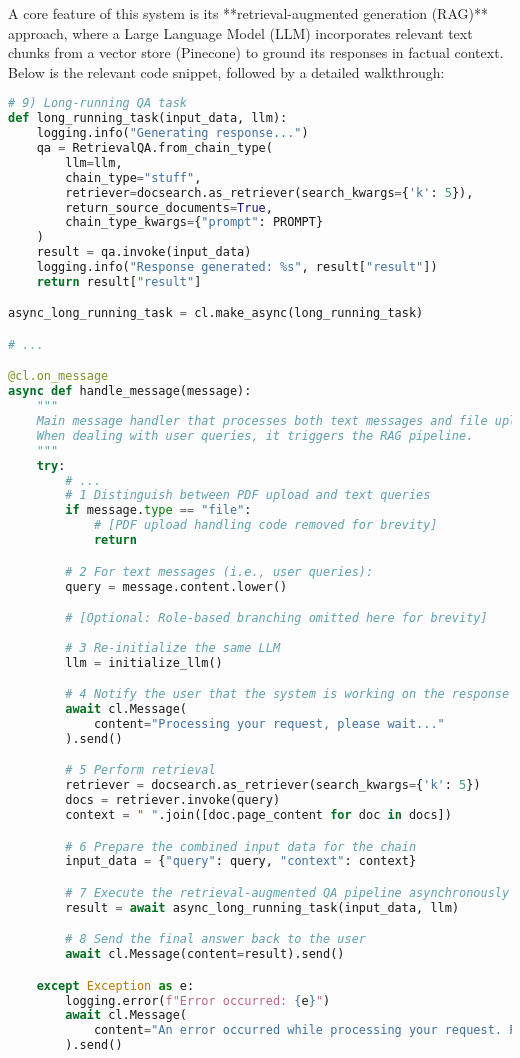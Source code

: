 A core feature of this system is its **retrieval-augmented generation (RAG)** approach, where a Large Language Model (LLM) incorporates relevant text chunks from a vector store (Pinecone) to ground its responses in factual context. Below is the relevant code snippet, followed by a detailed walkthrough:

\begin{lstlisting}[language=Python, caption={Retrieval-Augmented Generation (RAG) Pipeline}, basicstyle=\small\ttfamily]
# 9) Long-running QA task
def long_running_task(input_data, llm):
    logging.info("Generating response...")
    qa = RetrievalQA.from_chain_type(
        llm=llm,
        chain_type="stuff",
        retriever=docsearch.as_retriever(search_kwargs={'k': 5}),
        return_source_documents=True,
        chain_type_kwargs={"prompt": PROMPT}
    )
    result = qa.invoke(input_data)
    logging.info("Response generated: %s", result["result"])
    return result["result"]

async_long_running_task = cl.make_async(long_running_task)

# ...

@cl.on_message
async def handle_message(message):
    """
    Main message handler that processes both text messages and file uploads.
    When dealing with user queries, it triggers the RAG pipeline.
    """
    try:
        # ...
        # 1 Distinguish between PDF upload and text queries
        if message.type == "file":
            # [PDF upload handling code removed for brevity]
            return

        # 2 For text messages (i.e., user queries):
        query = message.content.lower()

        # [Optional: Role-based branching omitted here for brevity]
        
        # 3 Re-initialize the same LLM
        llm = initialize_llm()

        # 4 Notify the user that the system is working on the response
        await cl.Message(
            content="Processing your request, please wait..."
        ).send()

        # 5 Perform retrieval
        retriever = docsearch.as_retriever(search_kwargs={'k': 5})
        docs = retriever.invoke(query)
        context = " ".join([doc.page_content for doc in docs])

        # 6 Prepare the combined input data for the chain
        input_data = {"query": query, "context": context}

        # 7 Execute the retrieval-augmented QA pipeline asynchronously
        result = await async_long_running_task(input_data, llm)

        # 8 Send the final answer back to the user
        await cl.Message(content=result).send()

    except Exception as e:
        logging.error(f"Error occurred: {e}")
        await cl.Message(
            content="An error occurred while processing your request. Please try again."
        ).send()
\end{lstlisting}

